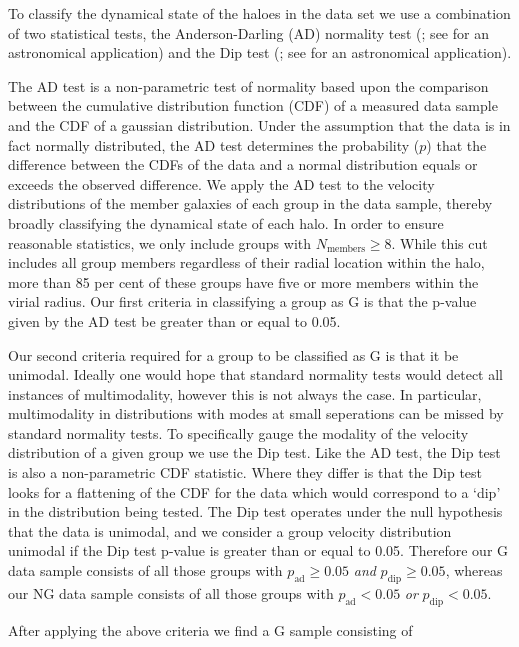 \documentclass[a4paper,fleqn,usenatbib]{mnras}
\begin{document}
To classify the dynamical state of the haloes in the data set we use a
combination of two statistical tests, the Anderson-Darling (AD)
normality test (\citealt{anderson1952}; see \citealt{hou2009, hou2013}
for an astronomical application) and the Dip test
(\citealt{hartigan1985}; see \citealt{ribeiro2013} for an astronomical
application).
\par
The AD test is a non-parametric test of normality based
upon the comparison between the cumulative distribution function (CDF) of a
measured data sample and the CDF of a gaussian distribution.  Under
the assumption that the data is in fact normally distributed, the AD
test determines the probability ($p$) that the difference between
the CDFs of the data and a normal distribution equals or exceeds the
observed difference.  We apply the AD test to the velocity
distributions of the member galaxies of each group in the data sample,
thereby broadly classifying the dynamical state of each halo.  In
order to ensure reasonable statistics, we only include groups with
$N_\text{members} \ge 8$.  While this cut includes all group members
regardless of their radial location within the halo, more than 85 per
cent of these groups have five or more members within the virial radius.  Our
first criteria in classifying a group as G is that the p-value given
by the AD test be greater than or equal to 0.05.
\par
Our second criteria required for a
group to be classified as G is that it be unimodal.  Ideally one would
hope that standard normality tests would detect all instances of
multimodality, however this is not always the case.  In particular,
multimodality in distributions with modes at small seperations
can be missed by standard normality tests. To specifically
gauge the modality of the velocity distribution of a given group we
use the Dip test.  Like the AD test, the Dip test is also a
non-parametric CDF statistic.  Where they differ is that the Dip test
looks for a flattening of the CDF for the data which would correspond
to a `dip' in the distribution being tested.  The Dip test operates
under the null hypothesis that the data is unimodal, and we consider a
group velocity distribution unimodal if the Dip test p-value is
greater than or equal to 0.05.  Therefore our G data sample consists
of all those groups with $p_{\text{ad}} \ge 0.05$
\emph{and} $p_{\text{dip}} \ge 0.05$, whereas our NG data
sample consists of all those groups with $p_{\text{ad}} < 0.05$
\emph{or} $p_{\text{dip}} < 0.05$.
\par
After applying the above criteria we find a G sample consisting of
\end{document}
